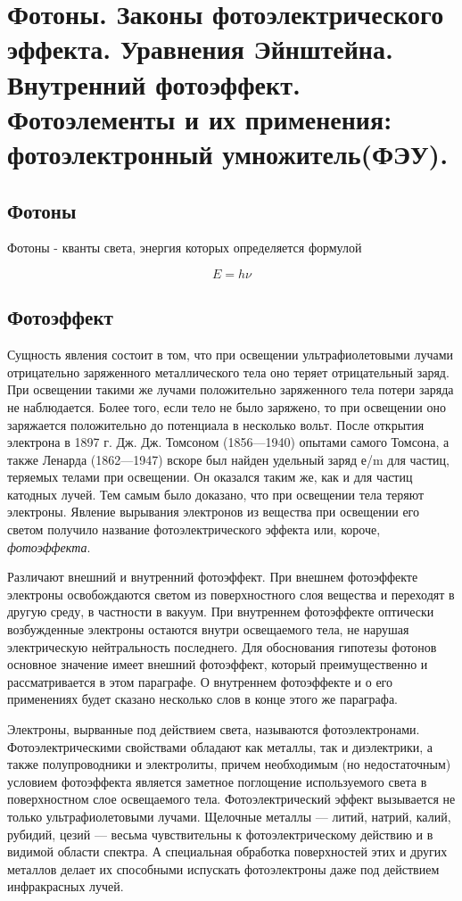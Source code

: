 

\section{Фотоны. Законы фотоэлектрического эффекта. Уравнения Эйнштейна. Внутренний фотоэффект. Фотоэлементы и их применения: фотоэлектронный умножитель(ФЭУ).}

\subsection{Фотоны}


Фотоны - кванты света, энергия которых определяется формулой

\begin{equation*}
    E = h\nu
\end{equation*}
\subsection{Фотоэффект}

Сущность явления состоит в том, что при освещении ультрафиолетовыми лучами отрицательно заряженного металлического тела оно теряет отрицательный заряд. При освещении такими же лучами положительно заряженного тела потери заряда не наблюдается. Более того, если тело не было заряжено, то при освещении оно заряжается положительно до потенциала в несколько вольт. После открытия электрона в 1897 г. Дж. Дж. Томсоном (1856—1940) опытами самого Томсона, а также Ленарда (1862—1947) вскоре был найден удельный заряд е/m для частиц, теряемых телами при освещении. Он оказался таким же, как и для частиц катодных лучей. Тем самым было доказано, что при освещении тела теряют электроны.
Явление вырывания электронов из вещества при освещении его светом получило название фотоэлектрического эффекта или, короче, \textit{фотоэффекта}.

\bigskip

Различают внешний и внутренний фотоэффект. При внешнем фотоэффекте электроны освобождаются светом из поверхностного слоя вещества и переходят в другую среду, в частности в вакуум. При внутреннем фотоэффекте оптически возбужденные электроны остаются внутри освещаемого тела, не нарушая электрическую нейтральность последнего. Для обоснования гипотезы фотонов основное значение имеет внешний фотоэффект, который преимущественно и рассматривается в этом параграфе. О внутреннем фотоэффекте и о его применениях будет сказано несколько слов в конце этого же параграфа.

Электроны, вырванные под действием света, называются фотоэлектронами. Фотоэлектрическими свойствами обладают как металлы, так и диэлектрики, а также полупроводники и электролиты, причем необходимым (но недостаточным) условием фотоэффекта является заметное поглощение используемого света в поверхностном слое освещаемого тела. Фотоэлектрический эффект вызывается не только ультрафиолетовыми лучами. Щелочные металлы — литий, натрий, калий, рубидий, цезий — весьма чувствительны к фотоэлектрическому действию и в видимой области спектра. А специальная обработка поверхностей этих и других металлов делает их способными испускать фотоэлектроны даже под действием инфракрасных лучей.



